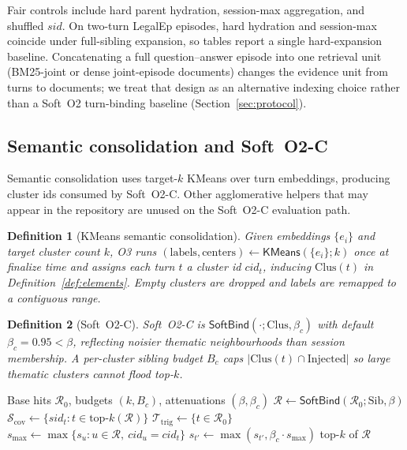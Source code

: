 \documentclass[preprint,12pt,authoryear]{elsarticle}
\newtheorem{definition}{Definition}
\begin{document}
Fair controls include hard parent hydration, session-max aggregation, and shuffled $sid$.
On two-turn LegalEp episodes, hard hydration and session-max coincide under full-sibling expansion, so tables report a single hard-expansion baseline.
Concatenating a full question--answer episode into one retrieval unit (BM25-joint or dense joint-episode documents) changes the evidence unit from turns to documents; we treat that design as an alternative indexing choice rather than a Soft~O2 turn-binding baseline (Section~\ref{sec:protocol}).

\subsection{Semantic consolidation and Soft~O2-C}\label{sec:soft-o2c}
Semantic consolidation uses target-$k$ KMeans over turn embeddings, producing cluster ids consumed by Soft~O2-C.
Other agglomerative helpers that may appear in the repository are unused on the Soft~O2-C evaluation path.

\begin{definition}[KMeans semantic consolidation]\label{def:kmeans}
Given embeddings $\{e_i\}$ and target cluster count $k$, O3 runs
$(\mathrm{labels},\mathrm{centers})\leftarrow\mathsf{KMeans}(\{e_i\};k)$
once at finalize time and assigns each turn $t$ a cluster id $cid_t$, inducing $\mathrm{Clus}(t)$ in Definition~\ref{def:elements}.
Empty clusters are dropped and labels are remapped to a contiguous range.
\end{definition}

\begin{definition}[Soft~O2-C]\label{def:soft-o2c}
Soft~O2-C is $\mathsf{SoftBind}(\cdot;\mathrm{Clus},\beta_c)$ with default $\beta_c{=}0.95<\beta$, reflecting noisier thematic neighbourhoods than session membership.
A per-cluster sibling budget $B_c$ caps $|\mathrm{Clus}(t)\cap\mathrm{Injected}|$ so large thematic clusters cannot flood top-$k$.
\end{definition}

\begin{algorithm}[t]
\caption{Gated Hybrid Soft~O2 + Soft~O2-C}
\label{alg:hybrid}
\begin{algorithmic}[1]
\Require Base hits $\mathcal{R}_0$, budgets $(k,B_c)$, attenuations $(\beta,\beta_c)$
\State $\mathcal{R}\leftarrow\mathsf{SoftBind}(\mathcal{R}_0;\mathrm{Sib},\beta)$ 
\State $\mathcal{S}_{\mathrm{cov}}\leftarrow\{sid_t:t\in\mathrm{top}\text{-}k(\mathcal{R})\}$
\State $\mathcal{T}_{\mathrm{trig}}\leftarrow\{t\in\mathcal{R}_0\}$ 
  \State $s_{\max}\leftarrow\max\{s_u:u\in\mathcal{R},\ cid_u=cid_t\}$
    \State $s_{t'}\leftarrow\max(s_{t'},\beta_c\cdot s_{\max})$
  \EndFor
\EndFor
\State \Return top-$k$ of $\mathcal{R}$
\end{algorithmic}
\end{algorithm}
\end{document}
